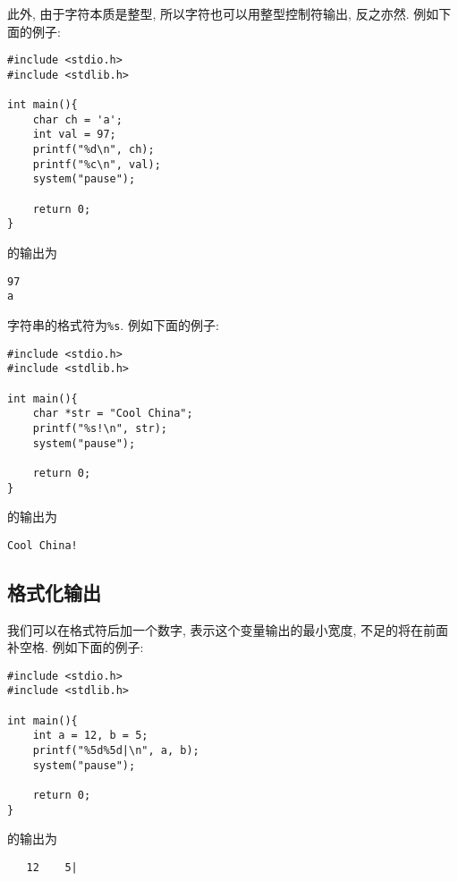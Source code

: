            此外, 由于字符本质是整型, 所以字符也可以用整型控制符输出, 反之亦然. 例如下面的例子:
\begin{lstlisting}
#include <stdio.h>
#include <stdlib.h>

int main(){
    char ch = 'a';
    int val = 97;
    printf("%d\n", ch);
    printf("%c\n", val);
    system("pause");

    return 0;
}
\end{lstlisting}
            的输出为
\begin{lstlisting}
97
a
\end{lstlisting}

        字符串的格式符为\texttt{\%s}. 例如下面的例子:
\begin{lstlisting}
#include <stdio.h>
#include <stdlib.h>

int main(){
    char *str = "Cool China";
    printf("%s!\n", str);
    system("pause");

    return 0;
}
\end{lstlisting}
        的输出为
\begin{lstlisting}
Cool China!
\end{lstlisting}

        \subsection*{格式化输出}
            我们可以在格式符后加一个数字, 表示这个变量输出的最小宽度, 不足的将在前面补空格. 例如下面的例子:
\begin{lstlisting}
#include <stdio.h>
#include <stdlib.h>

int main(){
    int a = 12, b = 5;
    printf("%5d%5d|\n", a, b);
    system("pause");

    return 0;
}
\end{lstlisting}
            的输出为
\begin{lstlisting}
   12    5|
\end{lstlisting}

